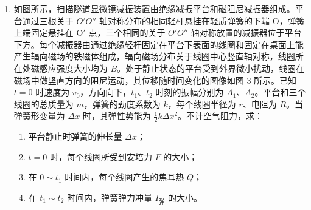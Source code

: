 \documentclass[\gkver]{gaokaozhenti}
\begin{document}
\begin{enumerate}
\item
如图所示，扫描隧道显微镜减振装置由绝缘减振平台和磁阻尼减振器组成。平台通过三根关于 $O'O''$ 轴对称分布的相同轻杆悬挂在轻质弹簧的下端 O，弹簧上端固定悬挂在 O$'$ 点，三个相同的关于 $O'O''$ 轴对称放置的减振器位于平台下方。每个减振器由通过绝缘轻杆固定在平台下表面的线圈和固定在桌面上能产生辐向磁场的铁磁体组成，辐向磁场分布关于线圈中心竖直轴对称，线圈所在处磁感应强度大小均为 $B$。处于静止状态的平台受到外界微小扰动，线圈在磁场中做竖直方向的阻尼运动，其位移随时间变化的图像如图 3 所示。已知 $t = 0$ 时速度为 $v_{0}$，方向向下，$t_{1}$、$t_{2}$ 时刻的振幅分别为 $A_{1}$、$A_{2}$。平台和三个线圈的总质量为 $m$，弹簧的劲度系数为 $k$，每个线圈半径为 $r$、电阻为 $R$。当弹簧形变量为 $\Delta x$ 时，其弹性势能为 $\frac{1}{2}k\Delta x^{2}$。不计空气阻力，求：

\begin{enumerate}
	\item
	平台静止时弹簧的伸长量 $\Delta x$；
	\item
	$t = 0$ 时，每个线圈所受到安培力 $F$ 的大小；
	\item
	在 $0\sim t_{1}$ 时间内，每个线圈产生的焦耳热 $Q$；
	\item
	在 $t_{1}\sim t_{2}$ 时间内，弹簧弹力冲量 $I_{\text{弹}}$ 的大小。
\end{enumerate}
\end{enumerate}
\end{document}
